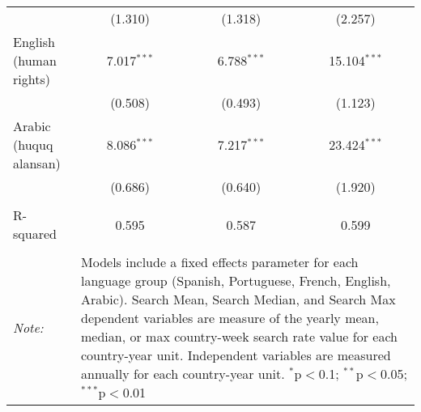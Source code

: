 \begin{table}[!htbp]
\begin{tabular}{@{\extracolsep{5pt}}lccc}
  & (1.310) & (1.318) & (2.257) \\ 
  English (human rights) & 7.017$^{***}$ & 6.788$^{***}$ & 15.104$^{***}$ \\ 
  & (0.508) & (0.493) & (1.123) \\ 
  Arabic (huquq alansan) & 8.086$^{***}$ & 7.217$^{***}$ & 23.424$^{***}$ \\ 
  & (0.686) & (0.640) & (1.920) \\ 
 \hline \\[-1.8ex] 
R-squared  & 0.595 & 0.587 & 0.599 \\ 
\hline 
\hline \\[-1.8ex] 
\textit{Note:}  & \multicolumn{3}{l}{\parbox[t]{8cm}{Models include a fixed effects parameter for each language group (Spanish, Portuguese, French, English, Arabic). Search Mean, Search Median, and Search Max dependent variables are measure of the yearly mean, median, or max country-week search rate value for each country-year unit. Independent variables are measured annually for each country-year unit. $^{*}$p$<$0.1; $^{**}$p$<$0.05; $^{***}$p$<$0.01}} \\ 
\end{tabular} 
\end{table} 

